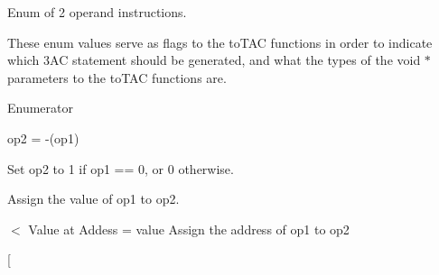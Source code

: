 Enum of 2 operand instructions. 

These enum values serve as flags to the to\-T\-A\-C functions in order to indicate which 3\-A\-C statement should be generated, and what the types of the void $\ast$ parameters to the to\-T\-A\-C functions are. \begin{Desc}
\item[Enumerator]\par
\begin{description}
\item[{\em 
\hypertarget{classTAC__Generator_a4e5a63c4a55a85d34f6ffebe5bf48129a308b492d7046c1f465e6219b0bf7bce8}{N\-E\-G}\label{classTAC__Generator_a4e5a63c4a55a85d34f6ffebe5bf48129a308b492d7046c1f465e6219b0bf7bce8}
}]op2 = -\/(op1) \item[{\em 
\hypertarget{classTAC__Generator_a4e5a63c4a55a85d34f6ffebe5bf48129a05adc6809a4b013f033bba555e2bafde}{N\-O\-T}\label{classTAC__Generator_a4e5a63c4a55a85d34f6ffebe5bf48129a05adc6809a4b013f033bba555e2bafde}
}]Set op2 to 1 if op1 == 0, or 0 otherwise. \item[{\em 
\hypertarget{classTAC__Generator_a4e5a63c4a55a85d34f6ffebe5bf48129a0aa9de21ced06e060900ea369cd0a203}{A\-S\-S\-I\-G\-N}\label{classTAC__Generator_a4e5a63c4a55a85d34f6ffebe5bf48129a0aa9de21ced06e060900ea369cd0a203}
}]Assign the value of op1 to op2. \item[{\em 
\hypertarget{classTAC__Generator_a4e5a63c4a55a85d34f6ffebe5bf48129aac4fd25c8abf0189d06c229ec73dc7a9}{A\-D\-D\-R}\label{classTAC__Generator_a4e5a63c4a55a85d34f6ffebe5bf48129aac4fd25c8abf0189d06c229ec73dc7a9}
}]$<$ Value at Addess = value Assign the address of op1 to op2 \item[{\em 
}
\end{description}
\end{Desc}
